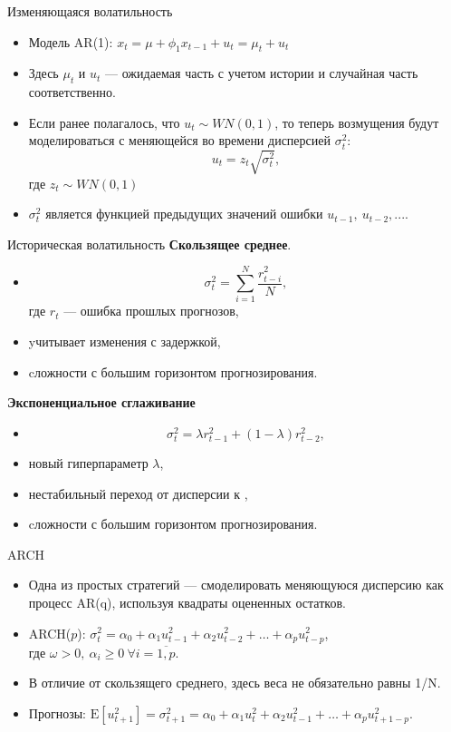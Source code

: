 \begin{frame}{Изменяющаяся волатильность}
\begin{itemize}

\item Модель AR(1): $x_t = \mu + \phi_1 x_{t-1} + u_t = \mu_t + u_t$
\item Здесь $\mu_t$ и $u_t$ — ожидаемая часть с учетом истории и случайная часть соответственно.

\item Если ранее полагалось, что $u_t \sim WN(0,1)$, то теперь возмущения будут моделироваться с меняющейся во времени дисперсией $\sigma_t^2$: $$u_t =  z_t \sqrt{\sigma_t^2},$$ где $z_t \sim WN(0,1)$
\item $\sigma_t^2$ является функцией предыдущих значений ошибки $u_{t-1}, \ u_{t-2}, ...$.

\end{itemize}
\end{frame}
\begin{frame}{Историческая волатильность}
\textbf{Скользящее среднее}.
\begin{itemize}
    \item $$ \sigma_t^2 = \sum_{i=1}^{N}\frac{r_{t-i}^2}{N},$$
     где $r_t$ --- ошибка прошлых прогнозов,
    \item yчитывает изменения с задержкой,
    \item cложности с большим горизонтом прогнозирования.
\end{itemize}
\textbf{Экспоненциальное сглаживание}
\begin{itemize}
    \item $$ \sigma_t^2 = \lambda r_{t-1}^2 + (1-\lambda) r_{t-2}^2,$$
\item новый гиперпараметр $\lambda$,
\item нестабильный переход от  дисперсии к ,
\item cложности с большим горизонтом прогнозирования.
\end{itemize}
\end{frame}
\begin{frame}{ARCH}
\begin{itemize}
\item  Одна из простых стратегий --- смоделировать меняющуюся дисперсию как процесс AR(q), используя квадраты оцененных остатков.
\item ARCH($p$): $ \sigma_t^2 = \alpha_0 + \alpha_1 u_{t-1}^2 + \alpha_2 u_{t-2}^2 + \dots + \alpha_p u_{t-p}^2 $,\\
где $\omega > 0, \ \alpha_i \geq 0 \ \forall i = \overline{1, p}$.
\item В отличие от скользящего среднего, здесь веса не обязательно равны 1/N.
\item Прогнозы: $ \mathrm{E}[u_{t+1}^2] = \sigma_{t+1}^2 = \alpha_0 + \alpha_1 u_{t}^2 + \alpha_2 u_{t-1}^2 + \dots + \alpha_p u_{t+1-p}^2 $.
\end{itemize}
\end{frame}

